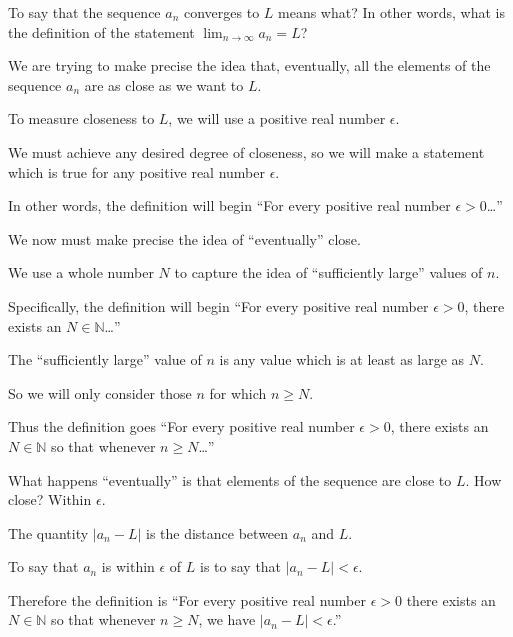 \documentclass{ximera}
\begin{document}
\begin{question}
  To say that the sequence $a_n$ converges to $L$ means what?  In
  other words, what is the definition of the statement
  $\lim_{n\to\infty} a_n = L$?
  \begin{hint}
    We are trying to make precise the idea that, eventually, all the elements of the sequence $a_n$ are as close as we want to $L$.
  \end{hint}
  \begin{hint}
    To measure closeness to $L$, we will use a positive real number $\epsilon$.
  \end{hint}
  \begin{hint}
    We must achieve any desired degree of closeness, so we will make a statement which is true for any positive real number $\epsilon$.
  \end{hint}
  \begin{hint}
    In other words, the definition will begin ``For every positive real number $\epsilon > 0$\ldots''
  \end{hint}
  \begin{hint}
    We now must make precise the idea of ``eventually'' close.
  \end{hint}
  \begin{hint}
    We use a whole number $N$ to capture the idea of ``sufficiently large'' values of $n$.
  \end{hint}
  \begin{hint}
    Specifically, the definition will begin ``For every positive real number $\epsilon > 0$, there exists an $N \in \mathbb{N}$\ldots''
  \end{hint}
  \begin{hint}
    The ``sufficiently large'' value of $n$ is any value which is at least as large as $N$.
  \end{hint}
  \begin{hint}
    So we will only consider those $n$ for which $n \ge N$.
  \end{hint}
    \begin{hint}
      Thus the definition goes ``For every positive real number $\epsilon > 0$, there exists an $N \in \mathbb{N}$ so that whenever $n \ge N$\ldots''
    \end{hint}
    \begin{hint}
      What happens ``eventually'' is that elements of the sequence are close to $L$.  How close?  Within $\epsilon$.
    \end{hint}
    \begin{hint}
      The quantity $|a_n - L|$ is the distance between $a_n$ and $L$.
    \end{hint}
    \begin{hint}
      To say that $a_n$ is within $\epsilon$ of $L$ is to say that $|a_n - L| < \epsilon$.
    \end{hint}
    \begin{hint}
      Therefore the definition is ``For every positive real number $\epsilon > 0$ there exists an $N \in \mathbb{N}$ so that whenever $n \ge N$, we have $ |a_n - L| < \epsilon $.''
    \end{hint}


\end{question}
\end{document}
